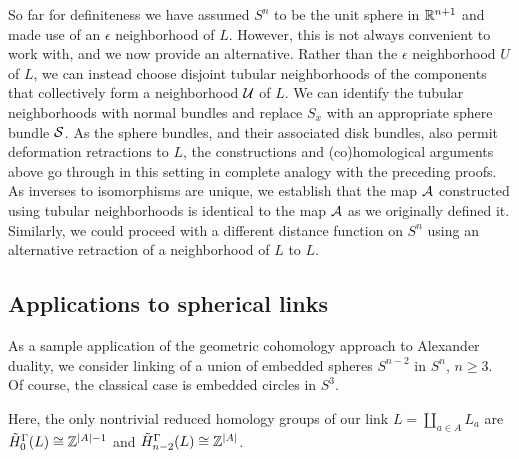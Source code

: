 \begin{remark}\label{R: Alex tubular}
	So far for definiteness we have assumed $S^n$ to be the unit sphere in $\mathbb{R}^{n+1}$ and made use of an $\epsilon$ neighborhood of $L$.
	However, this is not always convenient to work with, and we now provide an alternative.
	Rather than the $\epsilon$ neighborhood $U$ of $L$, we can instead choose disjoint tubular neighborhoods of the components that collectively form a neighborhood $\mathcal{U}$ of $L$.
	We can identify the tubular neighborhoods with normal bundles and replace $S_x$ with an appropriate sphere bundle $\mathcal{S}$.
	As the sphere bundles, and their associated disk bundles, also permit deformation retractions to $L$, the constructions and (co)homological arguments above go through in this setting in complete analogy with the preceding proofs.
	As inverses to isomorphisms are unique, we establish that the map $\mathcal{A}$ constructed using tubular neighborhoods is identical to the map $\mathcal{A}$ as we originally defined it.
	Similarly, we could proceed with a different distance function on $S^n$ using an alternative retraction of a neighborhood of $L$ to $L$.
\end{remark}


\subsection{Applications to spherical links}\label{S: links}

As a sample application of the geometric cohomology approach to Alexander duality, we consider linking of a union of embedded spheres $S^{n-2}$ in $S^n$, $n \geq 3$.
Of course, the classical case is embedded circles in $S^3$.

Here, the only nontrivial reduced homology groups of our link $L = \amalg_{a \in A} L_a$ are $\tilde H_0^\Gamma(L) \cong \mathbb{Z}^{|A|-1}$ and $\tilde H_{n-2}^\Gamma(L) \cong \mathbb{Z}^{|A|}$.

